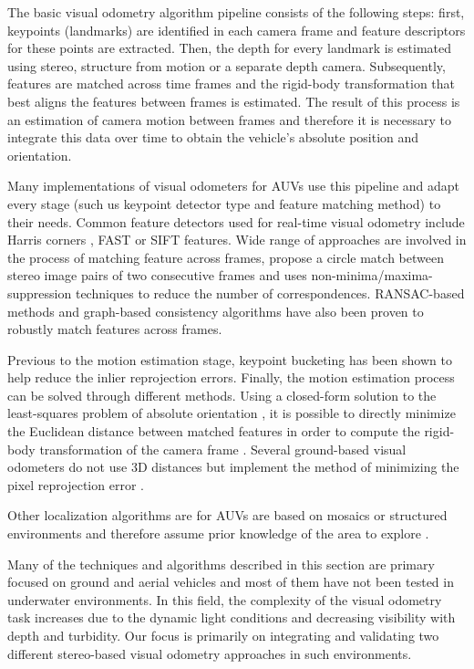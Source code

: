 \documentclass[conference]{IEEEtran}
\begin{document}
The basic visual odometry algorithm pipeline \cite{Moravec1980} consists of the following steps: first, keypoints (landmarks) are identified in each camera frame and feature descriptors for these points are extracted. Then, the depth for every landmark is estimated using stereo, structure from motion or a separate depth camera. Subsequently, features are matched across time frames and the rigid-body transformation that best aligns the features between frames is estimated. The result of this process is an estimation of camera motion between frames and therefore it is necessary to integrate this data over time to obtain the vehicle's absolute position and orientation.

Many implementations of visual odometers for AUVs use this pipeline and adapt every stage (such us keypoint detector type and feature matching method) to their needs. Common feature detectors used for real-time visual odometry include Harris corners \cite{Harris1988,Nister2006}, FAST \cite{Rosten2006,Huang2011} or SIFT \cite{Lowe2004,Botelho2009} features. Wide range of approaches are involved in the process of matching feature across frames, \cite{Geiger2011} propose a circle match between stereo image pairs of two consecutive frames and uses non-minima/maxima-suppression techniques \cite{Geiger2010} to reduce the number of correspondences. RANSAC-based methods \cite{Nister2004,Johnson2008} and graph-based consistency algorithms \cite{Howard2008} have also been proven to robustly match features across frames.

Previous to the motion estimation stage, keypoint bucketing \cite{Zhang1995} has been shown to help reduce the inlier reprojection errors. Finally, the motion estimation process can be solved through different methods. Using a closed-form solution to the least-squares problem of absolute orientation \cite{Horn1987}, it is possible to directly minimize the Euclidean distance between matched features in order to compute the rigid-body transformation of the camera frame \cite{Huang2011}. Several ground-based visual odometers do not use 3D distances but implement the method of minimizing the pixel reprojection error \cite{Howard2008,Geiger2011,Huang2011}. 

Other localization algorithms are for AUVs are based on mosaics or structured environments and therefore assume prior knowledge of the area to explore \cite{Garcia2001,Gracias2003,Carreras2003}.

Many of the techniques and algorithms described in this section are primary focused on ground and aerial vehicles and most of them have not been tested in underwater environments. In this field, the complexity of the visual odometry task increases due to the dynamic light conditions and decreasing visibility with depth and turbidity. Our focus is primarily on integrating and validating two different stereo-based visual odometry approaches in such environments.
\end{document}
